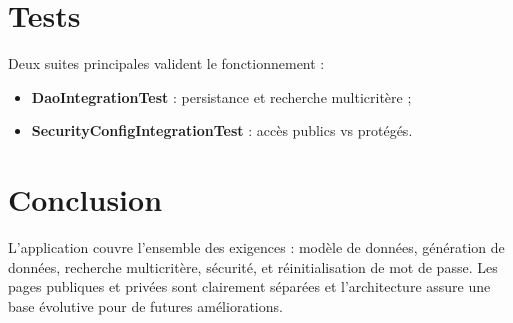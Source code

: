 \documentclass[a4paper,11pt]{article}
\begin{document}
\section*{Tests}
Deux suites principales valident le fonctionnement :
\begin{itemize}[leftmargin=*, label=\textbullet]
  \item \textbf{DaoIntegrationTest} : persistance et recherche multicritère ;
  \item \textbf{SecurityConfigIntegrationTest} : accès publics vs protégés.
\end{itemize}

\section*{Conclusion}
L'application couvre l'ensemble des exigences : modèle de données, génération de données, recherche multicritère, sécurité, et réinitialisation de mot de passe. Les pages publiques et privées sont clairement séparées et l'architecture assure une base évolutive pour de futures améliorations.
\end{document}
